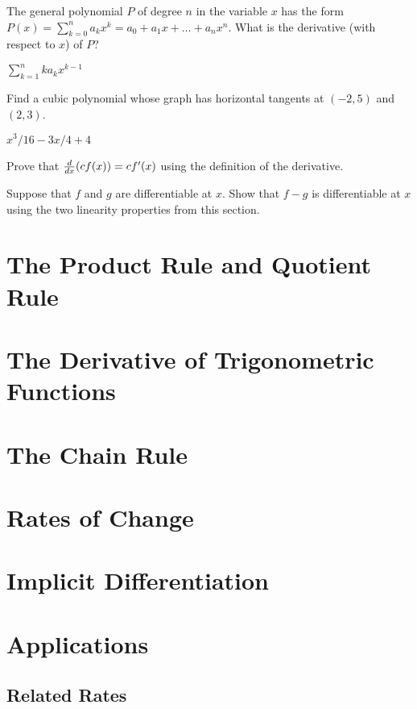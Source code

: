 \begin{exercises}
\begin{exercise} The general polynomial $P$ of degree $n$ in the variable $x$
has the form $P(x)= \sum _{k=0 } ^n a_k x^k = a_0 + a_1 x + \ldots
+ a_n x^n$. What is the derivative (with respect to $x$)
of $P$?
\begin{answer} $\sum_{k=1}^n ka_kx^{k-1}$
\end{answer}\end{exercise}

\begin{exercise} Find a cubic polynomial whose graph has horizontal tangents at
$(-2 , 5)$ and $(2, 3)$.
\begin{answer} $x^3/16-3x/4+4$
\end{answer}\end{exercise}
 
\begin{exercise} Prove that $\frac{d}{dx}(cf(x))= cf'(x)$ using the
definition of the derivative.
\end{exercise}

\begin{exercise} Suppose that $f$ and $g$ are differentiable at $x$. Show
that $f-g$ is differentiable at $x$ using the two linearity
properties from this section.
\end{exercise}

\end{exercises}



















\section{The Product Rule and Quotient Rule}

\section{The Derivative of Trigonometric Functions}

\section{The Chain Rule}


\section{Rates of Change}

\section{Implicit Differentiation}

\section{Applications}

\subsection{Related Rates}
